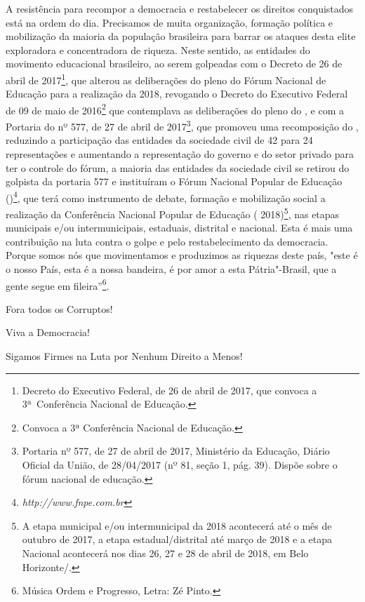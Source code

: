 A resistência para recompor a democracia e restabelecer os direitos
conquistados está na ordem do dia. Precisamos de muita organização,
formação política e mobilização da maioria da população brasileira para
barrar os ataques desta elite exploradora e concentradora de riqueza.
Neste sentido, as entidades do movimento educacional brasileiro, ao
serem golpeadas com o Decreto de 26 de abril de 2017\footnote{Decreto
  do Executivo Federal, de 26 de abril de 2017, que convoca a
  3ª~Conferência Nacional de Educação.}, que alterou as
deliberações do pleno do Fórum Nacional de Educação para a realização da
 2018, revogando o Decreto do Executivo Federal de 09 de maio de
2016\footnote{Convoca a 3ª Conferência Nacional de Educação.} que contemplava
as deliberações do pleno do , e com a Portaria do  nº 577, de 27
de abril de 2017\footnote{Portaria nº 577, de 27 de abril de
  2017, Ministério da Educação, Diário Oficial da União, de 28/04/2017
  (nº 81, seção 1, pág. 39). Dispõe sobre o fórum nacional de
  educação.},
que promoveu uma recomposição do , reduzindo a participação das
entidades da sociedade civil de 42 para 24 representações e aumentando a
representação do governo e do setor privado para ter o controle do
fórum, a maioria das entidades da sociedade civil se retirou do 
golpista da portaria 577 e instituíram o Fórum Nacional Popular de
Educação ()\footnote{\emph{http://www.fnpe.com.br}},
que terá como instrumento de debate, formação e mobilização social a
realização da Conferência Nacional Popular de Educação (
2018)\footnote{A etapa municipal e/ou intermunicipal da 
  2018 acontecerá até o mês de outubro de 2017, a etapa
  estadual/distrital até março de 2018 e a etapa Nacional acontecerá nos
  dias 26, 27 e 28 de abril de 2018, em Belo Horizonte/.}, nas etapas
municipais e/ou intermunicipais, estaduais, distrital e nacional. Esta é
mais uma contribuição na luta contra o golpe e pelo restabelecimento da
democracia. Porque somos nós que movimentamos e produzimos as riquezas
deste país, "este é o nosso País, esta é a nossa bandeira, é por amor a
esta Pátria"-Brasil, que a gente segue em fileira''\footnote{Música Ordem
  e Progresso, Letra: Zé Pinto.}.

Fora todos os Corruptos!

Viva a Democracia!

Sigamos Firmes na Luta por Nenhum Direito a Menos!
